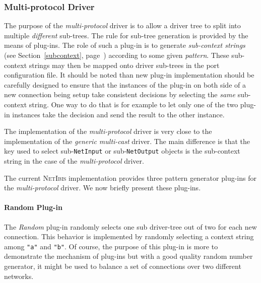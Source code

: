 \documentclass[11pt]{book}
\def\NetIbis{\textsc{NetIbis}\xspace}
\begin{document}
\subsubsection{Multi-protocol Driver}
\label{sec:multi-prot-driv}
The purpose of the \emph{multi-protocol} driver is to allow a driver
tree to split into multiple \emph{different} sub-trees. The rule for
sub-tree generation is provided by the means of plug-ins. The role of
such a plug-in is to generate \emph{sub-context strings} (see
Section~\ref{subcontext}, page~\pageref{subcontext}) according to some
given \emph{pattern}. These sub-context strings may then be mapped
onto driver sub-trees in the port configuration file. It should be
noted than new plug-in implementation should be carefully designed to
ensure that the instances of the plug-in on both side of a new
connection being setup take consistent decisions by selecting the
\emph{same} sub-context string. One way to do that is for example to
let only one of the two plug-in instances take the decision and send
the result to the other instance.

The implementation of the \emph{multi-protocol} driver is very close
to the implementation of the \emph{generic multi-cast} driver. The
main difference is that the key used to select sub-\texttt{NetInput}
or sub-\texttt{NetOutput} objects is the sub-context string in the
case of the \emph{multi-protocol} driver.

The current \NetIbis implementation provides three pattern generator
plug-ins for the \emph{multi-protocol} driver. We now briefly present
these plug-ins.

\paragraph{Random Plug-in}
\label{sec:random-plugin}
The \emph{Random} plug-in randomly selects one sub driver-tree out of
two for each new connection. This behavior is implemented by randomly
selecting a context string among \texttt{"a"} and \texttt{"b"}. Of
course, the purpose of this plug-in is more to demonstrate the
mechanism of plug-ins but with a good quality random number generator,
it might be used to balance a set of connections over two different
networks.
\end{document}
